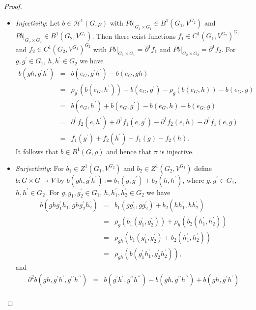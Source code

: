 \documentclass[10pt,a4paper]{amsart}
\begin{document}
\begin{proof}
\begin{itemize}
\item \emph{Injectivity}: Let $b\in\mathcal{H}^{1}(G,\rho)$ with $Pb|_{G_{1}\times G_{1}}\in B^{1}(G_{1},V^{G_{2}})$ and $Pb|_{G_{2}\times G_{2}}\in B^{1}(G_{2},V^{G_{1}})$. Then there exist functions $f_{1}\in C^{1}(G_{1},V^{G_{2}})^{G_{1}}$ and $f_{2}\in C^{1}(G_{2},V^{G_{1}})^{G_{2}}$ with $Pb|_{G_{1}\times G_{1}}=\partial^{1}f_{1}$ and $Pb|_{G_{2}\times G_{2}}=\partial^{1}f_{2}$. For $g,g^{\prime}\in G_{1}$, $h,h^{\prime}\in G_{2}$ we have 
\begin{eqnarray*}
b(gh,g^{\prime}h^{\prime}) & = & b(e_{G},g^{\prime}h^{\prime})-b(e_{G},gh)\\
 & = & \rho_{g^{\prime}}\left(b(e_{G},h^{\prime})\right)+b(e_{G},g^{\prime})-\rho_{g}\left(b(e_{G},h)\right)-b(e_{G},g)\\
 & = & b(e_{G},h^{\prime})+b(e_{G},g^{\prime})-b(e_{G},h)-b(e_{G},g)\\
 & = & \partial^{1}f_{2}(e,h^{\prime})+\partial^{1}f_{1}(e,g^{\prime})-\partial^{1}f_{2}(e,h)-\partial^{1}f_{1}(e,g)\\
 & = & f_{1}(g^{\prime})+f_{2}(h^{\prime})-f_{1}(g)-f_{2}(h).
\end{eqnarray*}
It follows that $b\in B^{1}(G,\rho)$ and hence that $\pi$ is injective.
\item \emph{Surjectivity}: For $b_{1}\in Z^{1}(G_{1},V^{G_{2}})$ and $b_{2}\in Z^{1}(G_{2},V^{G_{1}})$ define $b:G\times G\rightarrow V$ by $b(gh,g^{\prime}h^{\prime}):=b_{1}(g,g^{\prime})+b_{2}(h,h^{\prime})$, where $g,g^{\prime}\in G_{1}$, $h,h^{\prime}\in G_{2}$. For $g,g_{1}^{\prime},g_{2}^{\prime}\in G_{1}$, $h,h_{1}^{\prime},h_{2}^{\prime}\in G_{2}$ we have 
\begin{eqnarray*}
b(ghg_{1}^{\prime}h_{1}^{\prime},ghg_{2}^{\prime}h_{2}^{\prime}) & = & b_{1}(gg_{1}^{\prime},gg_{2}^{\prime})+b_{2}(hh_{1}^{\prime},hh_{2}^{\prime})\\
 & = & \rho_{g}\left(b_{1}(g_{1}^{\prime},g_{2}^{\prime})\right)+\rho_{h}\left(b_{2}(h_{1}^{\prime},h_{2}^{\prime})\right)\\
 & = & \rho_{gh}\left(b_{1}(g_{1}^{\prime},g_{2}^{\prime})+b_{2}(h_{1}^{\prime},h_{2}^{\prime})\right)\\
 & = & \rho_{gh}\left(b(g_{1}^{\prime}h_{1}^{\prime},g_{2}^{\prime}h_{2}^{\prime})\right),
\end{eqnarray*}
and 
\begin{eqnarray*}
\partial^{2}b(gh,g^{\prime}h^{\prime},g^{\prime\prime}h^{\prime\prime}) & = & b(g^{\prime}h^{\prime},g^{\prime\prime}h^{\prime\prime})-b(gh,g^{\prime\prime}h^{\prime\prime})+b(gh,g^{\prime}h^{\prime})\\

\end{eqnarray*}
\end{itemize}
\end{proof}
\end{document}
